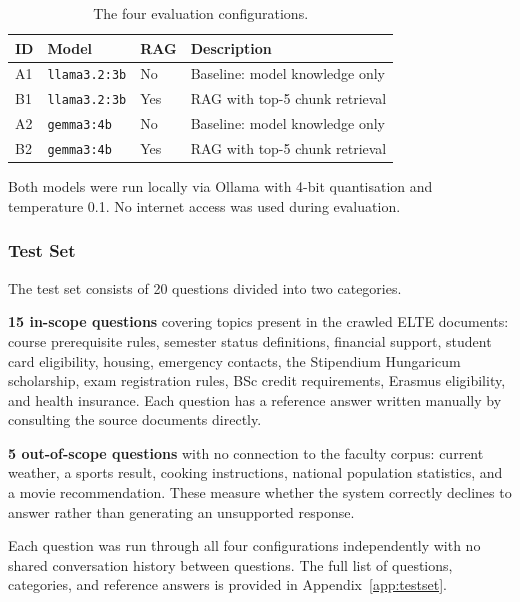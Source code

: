 \begin{table}[H]
    \centering
    \begin{tabular}{|l|l|l|l|}
        \hline
        \textbf{ID} & \textbf{Model} & \textbf{RAG} & \textbf{Description} \\
        \hline\hline
        A1 & \texttt{llama3.2:3b} & No  & Baseline: model knowledge only \\
        B1 & \texttt{llama3.2:3b} & Yes & RAG with top-5 chunk retrieval \\
        A2 & \texttt{gemma3:4b}   & No  & Baseline: model knowledge only \\
        B2 & \texttt{gemma3:4b}   & Yes & RAG with top-5 chunk retrieval \\
        \hline
    \end{tabular}
    \caption{The four evaluation configurations.}
    \label{tab:eval-configs}
\end{table}

Both models were run locally via Ollama with 4-bit quantisation and temperature
0.1. No internet access was used during evaluation.

\subsubsection*{Test Set}

The test set consists of 20 questions divided into two categories.

\textbf{15 in-scope questions} covering topics present in the crawled ELTE
documents: course prerequisite rules, semester status definitions, financial
support, student card eligibility, housing, emergency contacts, the Stipendium
Hungaricum scholarship, exam registration rules, BSc credit requirements,
Erasmus eligibility, and health insurance. Each question has a reference answer
written manually by consulting the source documents directly.

\textbf{5 out-of-scope questions} with no connection to the faculty corpus:
current weather, a sports result, cooking instructions, national population
statistics, and a movie recommendation. These measure whether the system
correctly declines to answer rather than generating an unsupported response.

Each question was run through all four configurations independently with no
shared conversation history between questions. The full list of questions,
categories, and reference answers is provided in Appendix~\ref{app:testset}.


